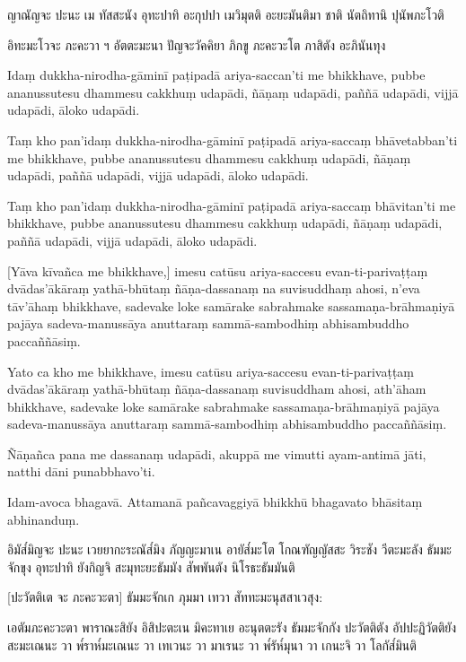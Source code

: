 \documentclass[
  babelLanguage=thai,
  final,
]{chantingbook}
\begin{document}
ญาณัญจะ ปะนะ เม ทัสสะนัง อุทะปาทิ อะกุปปา เมวิมุตติ อะยะมันติมา ชาติ นัตถิทานิ ปุนัพภะโวติ

อิทะมะโวจะ ภะคะวา ฯ อัตตะมะนา ปัญจะวัคคิยา ภิกขู ภะคะวะโต ภาสิตัง อะภินันทุง

\clearpage

\paliText
\markboth{\paliTitle}{\rightmark}

Idaṃ dukkha-nirodha-gāminī paṭipadā ariya-saccan'ti me bhikkhave, pubbe
ananussutesu dhammesu cakkhuṃ udapādi, ñāṇaṃ udapādi, paññā udapādi,
vijjā udapādi, āloko udapādi.

Taṃ kho pan'idaṃ dukkha-nirodha-gāminī paṭipadā ariya-saccaṃ bhāvetabban'ti
me bhikkhave, pubbe ananussutesu dhammesu cakkhuṃ udapādi, ñāṇaṃ
udapādi, paññā udapādi, vijjā udapādi, āloko udapādi.

Taṃ kho pan'idaṃ dukkha-nirodha-gāminī paṭipadā ariya-saccaṃ bhāvitan'ti me
bhikkhave, pubbe ananussutesu dhammesu cakkhuṃ udapādi, ñāṇaṃ udapādi,
paññā udapādi, vijjā udapādi, āloko udapādi.

[Yāva kīvañca me bhikkhave,] imesu catūsu ariya-saccesu evan-ti-parivaṭṭaṃ
dvādas'ākāraṃ yathā-bhūtaṃ ñāṇa-dassanaṃ na suvisuddhaṃ ahosi, n'eva tāv'āhaṃ
bhikkhave, sadevake loke samārake sabrahmake sassamaṇa-brāhmaṇiyā pajāya
sadeva-manussāya anuttaraṃ sammā-sambodhiṃ abhisambuddho paccaññāsiṃ.

Yato ca kho me bhikkhave, imesu catūsu ariya-saccesu evan-ti-parivaṭṭaṃ
dvādas'ākāraṃ yathā-bhūtaṃ ñāṇa-dassanaṃ suvisuddham ahosi, ath'āham
bhikkhave, sadevake loke samārake sabrahmake sassamaṇa-brāhmaṇiyā pajāya
sadeva-manussāya anuttaraṃ sammā-sambodhiṃ abhisambuddho paccaññāsiṃ.

Ñāṇañca pana me dassanaṃ udapādi, akuppā me vimutti ayam-antimā jāti,
natthi dāni punabbhavo'ti.

Idam-avoca bhagavā. Attamanā pañcavaggiyā bhikkhū bhagavato bhāsitaṃ
abhinanduṃ.

\clearpage

\thaiText
\markboth{\thaiTitle}{\rightmark}

อิมัส๎มิญจะ ปะนะ เวยยากะระณัส๎มิง ภัญญะมาเน อายัส๎มะโต โกณฑัญญัสสะ วิระชัง
วีตะมะลัง ธัมมะจักขุง อุทะปาทิ ยังกิญจิ สะมุทะยะธัมมัง สัพพันตัง นิโรธะธัมมันติ

[ปะวัตติเต จะ ภะคะวะตา] ธัมมะจักเก ภุมมา เทวา สัททะมะนุสสาเวสุง:

เอตัมภะคะวะตา พาราณะสิยัง อิสิปะตะเน มิคะทาเย อะนุตตะรัง ธัมมะจักกัง ปะวัตติตัง อัปปะฏิวัตติยัง
สะมะเณนะ วา พ๎ราห๎มะเณนะ วา เทเวนะ วา มาเรนะ วา พ๎รัห๎มุนา วา เกนะจิ วา โลกัส๎มินติ
\end{document}
